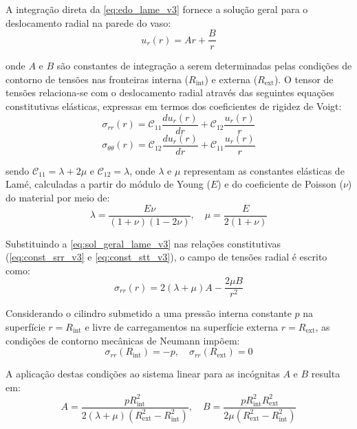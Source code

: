 A integração direta da \eqref{eq:edo_lame_v3} fornece a solução geral para o deslocamento radial na parede do vaso:
\begin{equation}
  u_r(r) = A r + \frac{B}{r}
  \label{eq:sol_geral_lame_v3}
\end{equation}

onde $A$ e $B$ são constantes de integração a serem determinadas pelas condições de contorno de tensões nas fronteiras interna ($R_{\text{int}}$) e externa ($R_{\text{ext}}$). O tensor de tensões relaciona-se com o deslocamento radial através das seguintes equações constitutivas elásticas, expressas em termos dos coeficientes de rigidez de Voigt:
\begin{equation}
  \sigma_{rr}(r) = \mathcal{C}_{11} \frac{d u_r(r)}{d r} + \mathcal{C}_{12} \frac{u_r(r)}{r}
  \label{eq:const_srr_v3}
\end{equation}
\begin{equation}
  \sigma_{\theta\theta}(r) = \mathcal{C}_{12} \frac{d u_r(r)}{d r} + \mathcal{C}_{11} \frac{u_r(r)}{r}
  \label{eq:const_stt_v3}
\end{equation}

sendo $\mathcal{C}_{11} = \lambda + 2\mu$ e $\mathcal{C}_{12} = \lambda$, onde $\lambda$ e $\mu$ representam as constantes elásticas de Lamé, calculadas a partir do módulo de Young ($E$) e do coeficiente de Poisson ($\nu$) do material por meio de:
\begin{equation}
  \lambda = \frac{E \nu}{(1 + \nu)(1 - 2\nu)}, \quad \mu = \frac{E}{2(1 + \nu)}
  \label{eq:const_lame_v3}
\end{equation}

Substituindo a \eqref{eq:sol_geral_lame_v3} nas relações constitutivas (\eqref{eq:const_srr_v3} e \eqref{eq:const_stt_v3}), o campo de tensões radial é escrito como:
\begin{equation}
  \sigma_{rr}(r) = 2 (\lambda + \mu) A - \frac{2 \mu B}{r^2}
  \label{eq:srr_geral_v3}
\end{equation}

Considerando o cilindro submetido a uma pressão interna constante $p$ na superfície $r = R_{\text{int}}$ e livre de carregamentos na superfície externa $r = R_{\text{ext}}$, as condições de contorno mecânicas de Neumann impõem:
\begin{equation}
  \sigma_{rr}(R_{\text{int}}) = -p, \quad \sigma_{rr}(R_{\text{ext}}) = 0
  \label{eq:cc_lame_v3}
\end{equation}

A aplicação destas condições ao sistema linear para as incógnitas $A$ e $B$ resulta em:
\begin{equation}
  A = \frac{p R_{\text{int}}^2}{2 (\lambda + \mu) (R_{\text{ext}}^2 - R_{\text{int}}^2)}, \quad B = \frac{p R_{\text{int}}^2 R_{\text{ext}}^2}{2 \mu (R_{\text{ext}}^2 - R_{\text{int}}^2)}
  \label{eq:const_ab_v3}
\end{equation}

